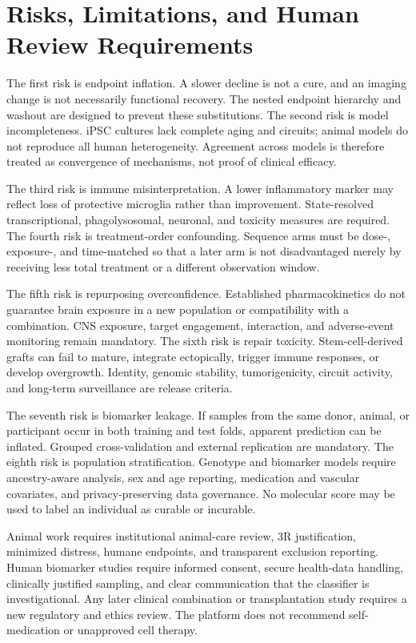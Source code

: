 \documentclass[conference]{IEEEtran}
\begin{document}
\section{Risks, Limitations, and Human Review Requirements}
The first risk is endpoint inflation. A slower decline is not a cure, and an imaging change is not necessarily functional recovery. The nested endpoint hierarchy and washout are designed to prevent these substitutions. The second risk is model incompleteness. iPSC cultures lack complete aging and circuits; animal models do not reproduce all human heterogeneity. Agreement across models is therefore treated as convergence of mechanisms, not proof of clinical efficacy.

The third risk is immune misinterpretation. A lower inflammatory marker may reflect loss of protective microglia rather than improvement. State-resolved transcriptional, phagolysosomal, neuronal, and toxicity measures are required. The fourth risk is treatment-order confounding. Sequence arms must be dose-, exposure-, and time-matched so that a later arm is not disadvantaged merely by receiving less total treatment or a different observation window.

The fifth risk is repurposing overconfidence. Established pharmacokinetics do not guarantee brain exposure in a new population or compatibility with a combination. CNS exposure, target engagement, interaction, and adverse-event monitoring remain mandatory. The sixth risk is repair toxicity. Stem-cell-derived grafts can fail to mature, integrate ectopically, trigger immune responses, or develop overgrowth. Identity, genomic stability, tumorigenicity, circuit activity, and long-term surveillance are release criteria.

The seventh risk is biomarker leakage. If samples from the same donor, animal, or participant occur in both training and test folds, apparent prediction can be inflated. Grouped cross-validation and external replication are mandatory. The eighth risk is population stratification. Genotype and biomarker models require ancestry-aware analysis, sex and age reporting, medication and vascular covariates, and privacy-preserving data governance. No molecular score may be used to label an individual as curable or incurable.

Animal work requires institutional animal-care review, 3R justification, minimized distress, humane endpoints, and transparent exclusion reporting. Human biomarker studies require informed consent, secure health-data handling, clinically justified sampling, and clear communication that the classifier is investigational. Any later clinical combination or transplantation study requires a new regulatory and ethics review. The platform does not recommend self-medication or unapproved cell therapy.
\end{document}
